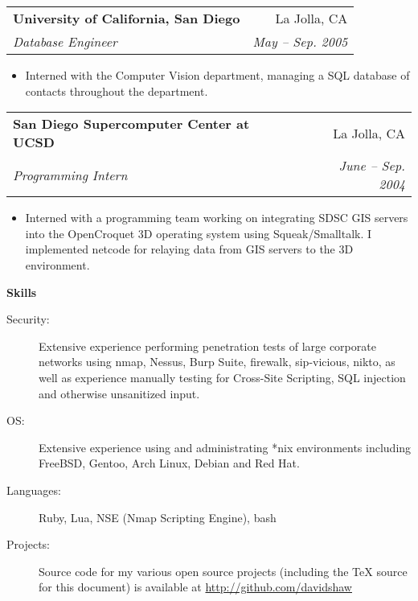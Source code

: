 \documentclass[letterpaper,11pt]{article}
\makeatletter
\newcommand{\resitem}[1]{\item #1 \vspace{-2pt}}
\newcommand{\resheading}[1]{{\large \colorbox{mygrey}{\begin{minipage}{\textwidth}{\textbf{#1 \vphantom{p\^{E}}}}\end{minipage}}}}
\newcommand{\ressubheading}[4]{
\begin{tabular*}{6.5in}{l@{\extracolsep{\fill}}r}
		\textbf{#1} & #2 \\
		\textit{#3} & \textit{#4} \\
\end{tabular*}\vspace{-6pt}}
\makeatother
\begin{document}
\begin{description}
{\begin{itemize}
				\end{itemize}
				}
	\item\ressubheading{{University of California, San Diego}}{La Jolla, CA}{Database Engineer}{May -- Sep. 2005}
				{ \footnotesize
				\begin{itemize}
					\resitem{Interned with the Computer Vision department, managing a SQL database of contacts throughout the department.}
				\end{itemize}
				}
	\item\ressubheading{{San Diego Supercomputer Center at UCSD}}{La Jolla, CA}{Programming Intern}{June -- Sep. 2004}
				{ \footnotesize
				\begin{itemize}
					\resitem{Interned with a programming team working on integrating SDSC GIS servers into the OpenCroquet 3D operating system using Squeak/Smalltalk. I implemented netcode for relaying data from GIS servers to the 3D environment.}
				\end{itemize}
				}
	\end{description}  %

\resheading{{Skills}}
	\begin{description}
		\item[Security:] { \footnotesize Extensive experience performing penetration tests of large corporate networks using nmap, Nessus, Burp Suite, firewalk, sip-vicious, nikto, as well as experience manually testing for Cross-Site Scripting, SQL injection and otherwise unsanitized input.}
		\item[OS:] { \footnotesize Extensive experience using and administrating *nix environments including FreeBSD, Gentoo, Arch Linux, Debian and Red Hat.}
		\item[Languages:] { \footnotesize Ruby, Lua, NSE (Nmap Scripting Engine), bash}
		\item[Projects:] { \footnotesize Source code for my various open source projects (including the TeX source for this document) is available at \href{http://www.github.com/davidshaw}{http://github.com/davidshaw}}
	\end{description} %
\end{document}

